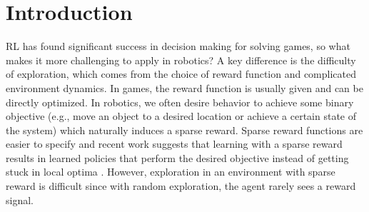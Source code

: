 % 






\section{Introduction}

RL has found significant success in decision making for solving games, so what makes it more challenging to apply in robotics? A key difference is the difficulty of exploration, which comes from  the choice of reward function and complicated environment dynamics. In games, the reward function is usually given and can be directly optimized. In robotics, we often desire behavior to achieve some binary objective (e.g., move an object to a desired location or achieve a certain state of the system) which naturally induces a sparse reward. Sparse reward functions are easier to specify and recent work suggests that learning with a sparse reward results in learned policies that perform the desired objective instead of getting stuck in local optima \citep{andrychowicz2017her, vecerik17ddpgfd}. However, exploration in an environment with sparse reward is difficult since with random exploration, the agent rarely sees a reward signal.

